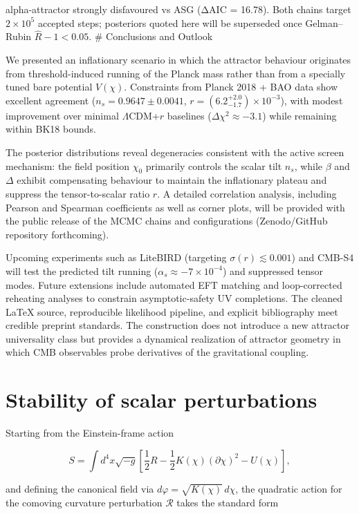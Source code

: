 \documentclass[
]{article}
\begin{document}
alpha-attractor strongly disfavoured vs ASG (ΔAIC = 16.78). Both chains
target \(2\times10^5\) accepted steps; posteriors quoted here will be
superseded once Gelman--Rubin \(\hat{R}-1 < 0.05\). \# Conclusions and
Outlook

We presented an inflationary scenario in which the attractor behaviour
originates from threshold-induced running of the Planck mass rather than
from a specially tuned bare potential \(V(\chi)\). Constraints from
Planck 2018 + BAO data show excellent agreement
(\(n_{s} = 0.9647 \pm 0.0041\),
\(r = ({6.2}_{- 1.7}^{+ 2.0}) \times 10^{- 3}\)), with modest
improvement over minimal \(\Lambda\)CDM+\(r\) baselines
(\(\Delta\chi^{2} \approx - 3.1\)) while remaining within BK18 bounds.

The posterior distributions reveal degeneracies consistent with the
active screen mechanism: the field position \(\chi_{0}\) primarily
controls the scalar tilt \(n_{s}\), while \(\beta\) and \(\Delta\)
exhibit compensating behaviour to maintain the inflationary plateau and
suppress the tensor-to-scalar ratio \(r\). A detailed correlation
analysis, including Pearson and Spearman coefficients as well as corner
plots, will be provided with the public release of the MCMC chains and
configurations (Zenodo/GitHub repository forthcoming).

Upcoming experiments such as LiteBIRD (targeting
\(\sigma(r) \lesssim 0.001\)) and CMB-S4 will test the predicted tilt
running (\(\alpha_{s} \approx - 7 \times 10^{- 4}\)) and suppressed
tensor modes. Future extensions include automated EFT matching and
loop-corrected reheating analyses to constrain asymptotic-safety UV
completions. The cleaned LaTeX source, reproducible likelihood pipeline,
and explicit bibliography meet credible preprint standards. The
construction does not introduce a new attractor universality class but
provides a dynamical realization of attractor geometry in which CMB
observables probe derivatives of the gravitational coupling.

\section{Stability of scalar
perturbations}\label{stability-of-scalar-perturbations}

Starting from the Einstein-frame action

\[
S = \int d^{4}x\sqrt{- g}\left\lbrack \frac{1}{2}R - \frac{1}{2}K(\chi)(\partial\chi)^{2} - U(\chi) \right\rbrack,
\]

and defining the canonical field via
\(d\varphi = \sqrt{K(\chi)}\, d\chi\), the quadratic action for the
comoving curvature perturbation \(\mathcal{R}\) takes the standard form
\end{document}
